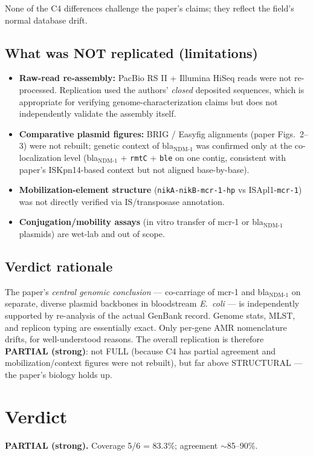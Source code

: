 \documentclass[11pt]{article}
\begin{document}
None of the C4 differences challenge the paper's claims; they reflect the field's normal database drift.

\subsection{What was NOT replicated (limitations)}

\begin{itemize}[nosep]
  \item \textbf{Raw-read re-assembly:} PacBio RS II + Illumina HiSeq reads were not re-processed. Replication used the authors' \emph{closed} deposited sequences, which is appropriate for verifying genome-characterization claims but does not independently validate the assembly itself.
  \item \textbf{Comparative plasmid figures:} BRIG / Easyfig alignments (paper Figs.\ 2--3) were not rebuilt; genetic context of bla$_{\text{NDM-1}}$ was confirmed only at the co-localization level (bla$_{\text{NDM-1}}$ + \texttt{rmtC} + \texttt{ble} on one contig, consistent with paper's ISKpn14-based context but not aligned base-by-base).
  \item \textbf{Mobilization-element structure} (\texttt{nikA-nikB-mcr-1-hp} vs ISApl1-\texttt{mcr-1}) was not directly verified via IS/transposase annotation.
  \item \textbf{Conjugation/mobility assays} (in vitro transfer of mcr-1 or bla$_{\text{NDM-1}}$ plasmids) are wet-lab and out of scope.
\end{itemize}

\subsection{Verdict rationale}

The paper's \emph{central genomic conclusion} --- co-carriage of mcr-1 and bla$_{\text{NDM-1}}$ on separate, diverse plasmid backbones in bloodstream \textit{E.\ coli} --- is independently supported by re-analysis of the actual GenBank record. Genome stats, MLST, and replicon typing are essentially exact. Only per-gene AMR nomenclature drifts, for well-understood reasons. The overall replication is therefore \textbf{PARTIAL (strong)}: not FULL (because C4 has partial agreement and mobilization/context figures were not rebuilt), but far above STRUCTURAL --- the paper's biology holds up.

\section{Verdict}

\textbf{PARTIAL (strong).} Coverage 5/6 = 83.3\%; agreement $\sim$85--90\%.
\end{document}
